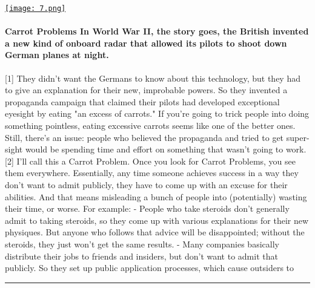 \documentclass[10pt,a4paper]{article}
\begin{document}
\begin{minipage}[t]{0.80\linewidth}
\vspace{0pt}
\begin{multicols}{2}

    \href{https://www.atvbt.com/the-carrot-problem/?utm\_source=hackernewsletter\&utm\_medium=email\&utm\_term=fav}{
        \texttt{[image: 7.png]}
    }
  
\paragraph{Carrot Problems
In World War II, the story goes, the British invented a new kind of onboard radar that allowed its pilots to shoot down German planes at night.}
[1]
They didn't want the Germans to know about this technology, but they had to give an explanation for their new, improbable powers.
So they invented a propaganda campaign that claimed their pilots had developed exceptional eyesight by eating "an excess of carrots."
If you're going to trick people into doing something pointless, eating excessive carrots seems like one of the better ones. Still, there's an issue: people who believed the propaganda and tried to get super-sight would be spending time and effort on something that wasn't going to work.[2]
I'll call this a Carrot Problem.
Once you look for Carrot Problems, you see them everywhere. Essentially, any time someone achieves success in a way they don't want to admit publicly, they have to come up with an excuse for their abilities. And that means misleading a bunch of people into (potentially) wasting their time, or worse.
For example:
- People who take steroids don't generally admit to taking steroids, so they come up with various explanations for their new physiques. But anyone who follows that advice will be disappointed; without the steroids, they just won't get the same results.
- Many companies basically distribute their jobs to friends and insiders, but don't want to admit that publicly. So they set up public application processes, which cause outsiders to 

\end{multicols}
\end{minipage}
\par\medskip
\noindent\textcolor{red}{\rule{\linewidth}{0.2mm}}
\end{document}
